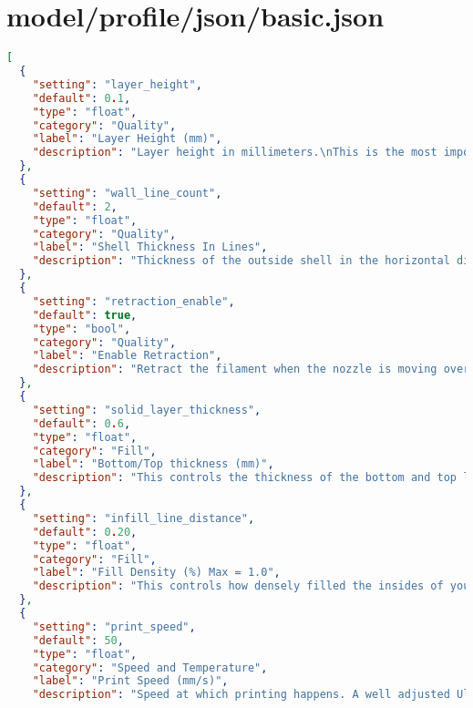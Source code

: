\section{model/profile/json/basic.json}
\begin{lstlisting}[language=json, label={lst:basic}, caption=A full static settings file. There were five more files like this but one is sufficient to show the structure of this code.]
[
  {
    "setting": "layer_height",
    "default": 0.1,
    "type": "float",
    "category": "Quality",
    "label": "Layer Height (mm)",
    "description": "Layer height in millimeters.\nThis is the most important setting to determine the quality of your print. Normal quality prints are 0.1mm, high quality is 0.06mm. You can go up to 0.25mm with an Ultimaker for very fast prints at low quality."
  },
  {
    "setting": "wall_line_count",
    "default": 2,
    "type": "float",
    "category": "Quality",
    "label": "Shell Thickness In Lines",
    "description": "Thickness of the outside shell in the horizontal direction.\nThis is used in combination with the nozzle size to define the number\nof perimeter lines and the thickness of those perimeter lines."
  },
  {
    "setting": "retraction_enable",
    "default": true,
    "type": "bool",
    "category": "Quality",
    "label": "Enable Retraction",
    "description": "Retract the filament when the nozzle is moving over a none-printed area. Details about the retraction can be configured in the advanced tab."
  },
  {
    "setting": "solid_layer_thickness",
    "default": 0.6,
    "type": "float",
    "category": "Fill",
    "label": "Bottom/Top thickness (mm)",
    "description": "This controls the thickness of the bottom and top layers, the amount of solid layers put down is calculated by the layer thickness and this value.\nHaving this value a multiple of the layer thickness makes sense. And keep it near your wall thickness to make an evenly strong part."
  },
  {
    "setting": "infill_line_distance",
    "default": 0.20,
    "type": "float",
    "category": "Fill",
    "label": "Fill Density (%) Max = 1.0",
    "description": "This controls how densely filled the insides of your print will be. For a solid part use 100%, for an empty part use 0%. A value around 20% is usually enough.\nThis won't affect the outside of the print and only adjusts how strong the part becomes."
  },
  {
    "setting": "print_speed",
    "default": 50,
    "type": "float",
    "category": "Speed and Temperature",
    "label": "Print Speed (mm/s)",
    "description": "Speed at which printing happens. A well adjusted Ultimaker can reach 150mm/s, but for good quality prints you want to print slower. Printing speed depends on a lot of factors. So you will be experimenting with optimal settings for this."

\end{lstlisting}
